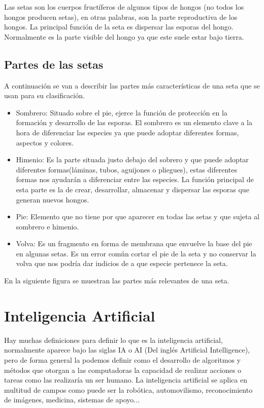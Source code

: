 Las setas son los cuerpos fructíferos de algunos tipos de hongos (no todos los hongos producen setas), en otras palabras, son la parte reproductiva de los hongos. La principal función de la seta es dispersar las esporas del hongo. Normalmente es la parte visible del hongo ya que este suele estar bajo tierra.

\subsection{Partes de las setas}

A continuación se van a describir las partes más características de una seta que se usan para su clasificación.

\begin{itemize}
	\item{Sombrero}: Situado sobre el pie, ejerce la función de protección en la formación y desarrollo de las esporas. El sombrero es un elemento clave a la hora de diferenciar las especies ya que puede adoptar diferentes formas, aspectos y colores.
	\item{Himenio}: Es la parte situada justo debajo del sobrero y que puede adoptar diferentes formas(láminas, tubos, aguijones o pliegues), estas diferentes formas nos ayudarán a diferenciar entre las especies. La función principal de esta parte es la de crear, desarrollar, almacenar y dispersar las esporas que generan nuevos hongos.
	\item{Pie}: Elemento que no tiene por que aparecer en todas las setas y que sujeta al sombrero e himenio.
	\item{Volva}: Es un fragmento en forma de membrana que envuelve la base del pie en algunas setas. Es un error común cortar el pie de la seta y no conservar la volva que nos podría dar indicios de a que especie pertenece la seta.~\cite{partesSeta}
\end{itemize}

En la siguiente figura se muestran las partes más relevantes de una seta.

\section{Inteligencia Artificial}
Hay muchas definiciones para definir lo que es la inteligencia artificial, normalmente aparece bajo las siglas IA o AI (Del inglés Artificial Intelligence), pero de forma general la podemos definir como el desarrollo de algoritmos y métodos que otorgan a las computadoras la capacidad de realizar acciones o tareas como las realizaría un ser humano. La inteligencia artificial se aplica en multitud de campos como puede ser la robótica, automovilismo, reconocimiento de imágenes, medicina, sistemas de apoyo...

